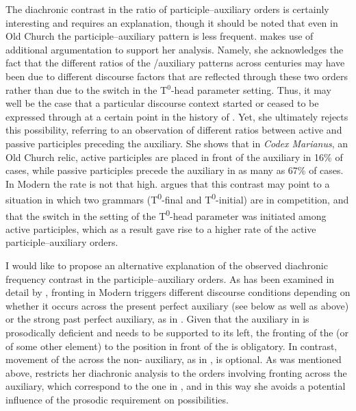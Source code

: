 \documentclass[output=paper,modfonts,newtxmath,hidelinks]{langscibook}
\begin{document}
The diachronic contrast in the ratio of participle--auxiliary orders is certainly interesting and requires an explanation, though it should be noted that even in Old Church  the participle--auxiliary pattern is less frequent. \citet{pancheva2008} makes use of additional argumentation to support her analysis. Namely, she acknowledges the fact that the different ratios of the /auxiliary patterns across centuries may have been due to different discourse factors that are reflected through these two orders rather than due to the switch in the T$^0$-head parameter setting. Thus, it may well be the case that a particular discourse context started or ceased to be expressed through  at a certain point in the history of . Yet, she ultimately rejects this possibility, referring to an observation of different ratios between active and passive participles preceding the auxiliary. She shows that in \textit{Codex Marianus}, an Old Church  relic, active participles are placed in front of the auxiliary in 16\% of cases, while passive participles precede the auxiliary in as many as 67\% of cases. In Modern  the rate is not that high. \citeauthor{pancheva2008} argues that this contrast may point to a situation in which two grammars (T\textsuperscript{0}{}-final and T\textsuperscript{0}{}-initial) are in competition, and that the switch in the setting of the T\textsuperscript{0}{}-head parameter was initiated among active participles, which as a result gave rise to a higher rate of the active participle--auxiliary orders.

I would like to propose an alternative explanation of the observed diachronic frequency contrast in the participle--auxiliary orders. As has been examined in detail by \citet{lambova2003},  fronting in Modern  triggers different discourse conditions depending on whether it occurs across the present perfect auxiliary  (see  below as well as  above) or the strong past perfect auxiliary, as in . Given that the auxiliary in  is prosodically deficient and needs to be supported to its left, the fronting of the  (or of some other element) to the position in front of the  is obligatory. In contrast, movement of the  across the non- auxiliary, as in , is optional. As was mentioned above, \citeauthor{pancheva2008} restricts her diachronic analysis to the orders involving  fronting across the  auxiliary, which correspond to the one in , and in this way she avoids a potential influence of the  prosodic requirement on  possibilities.
\end{document}
